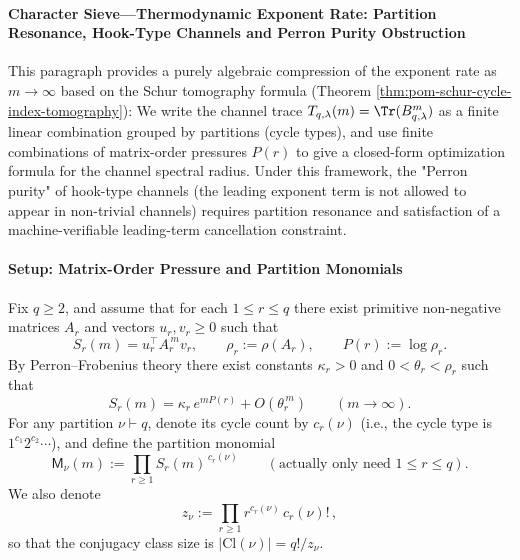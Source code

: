 
\paragraph{Character Sieve—Thermodynamic Exponent Rate: Partition Resonance, Hook-Type Channels and Perron Purity Obstruction}\label{subsubsec:pom-schur-character-sieve-thermodynamic}
This paragraph provides a purely algebraic compression of the exponent rate as \(m\to\infty\) based on the Schur tomography formula (Theorem \ref{thm:pom-schur-cycle-index-tomography}):
We write the channel trace \(T_{q,\lambda}(m)=\Tr(B_{q,\lambda}^m)\) as a finite linear combination grouped by partitions (cycle types), and use finite combinations of matrix-order pressures \(P(r)\) to give a closed-form optimization formula for the channel spectral radius.
Under this framework, the "Perron purity" of hook-type channels (the leading exponent term is not allowed to appear in non-trivial channels) requires partition resonance and satisfaction of a machine-verifiable leading-term cancellation constraint.

\paragraph{Setup: Matrix-Order Pressure and Partition Monomials}
Fix \(q\ge 2\), and assume that for each \(1\le r\le q\) there exist primitive non-negative matrices \(A_r\) and vectors \(u_r,v_r\ge 0\) such that
\[
S_r(m)=u_r^{\top}A_r^{\,m}v_r,
\qquad
\rho_r:=\rho(A_r),
\qquad
P(r):=\log\rho_r.
\]
By Perron--Frobenius theory there exist constants \(\kappa_r>0\) and \(0<\theta_r<\rho_r\) such that
\begin{equation}\label{eq:pom-sr-main-term-kappa}
S_r(m)=\kappa_r\,e^{mP(r)}+O(\theta_r^{\,m})\qquad(m\to\infty).
\end{equation}
For any partition \(\nu\vdash q\), denote its cycle count by \(c_r(\nu)\) (i.e., the cycle type is \(1^{c_1}2^{c_2}\cdots\)), and define the partition monomial
\[
\mathsf{M}_\nu(m):=\prod_{r\ge 1} S_r(m)^{\,c_r(\nu)}\qquad(\text{actually only need }1\le r\le q).
\]
We also denote
\[
z_\nu:=\prod_{r\ge 1} r^{c_r(\nu)}\,c_r(\nu)!\,,
\]
so that the conjugacy class size is \(|\mathrm{Cl}(\nu)|=q!/z_\nu\).

